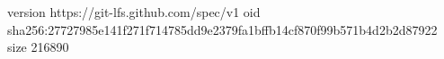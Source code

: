 version https://git-lfs.github.com/spec/v1
oid sha256:27727985e141f271f714785dd9e2379fa1bffb14cf870f99b571b4d2b2d87922
size 216890
